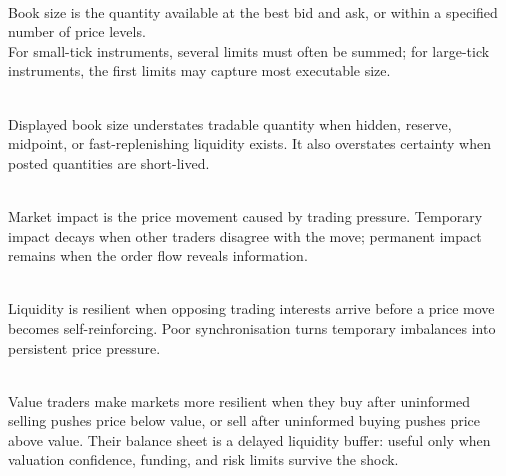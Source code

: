 \begin{definition} \\
Book size is the quantity available at the best bid and ask, or within a specified number of price levels.\\
For small-tick instruments, several limits must often be summed; for large-tick instruments, the first limits may capture most executable size.
\end{definition}

\begin{caveat} \\
Displayed book size understates tradable quantity when hidden, reserve, midpoint, or fast-replenishing liquidity exists. It also overstates certainty when posted quantities are short-lived.
\end{caveat}

\begin{mechanism} \\
Market impact is the price movement caused by trading pressure. Temporary impact decays when other traders disagree with the move; permanent impact remains when the order flow reveals information.
\end{mechanism}

\begin{principle} \\
Liquidity is resilient when opposing trading interests arrive before a price move becomes self-reinforcing. Poor synchronisation turns temporary imbalances into persistent price pressure.
\end{principle}

\begin{mechanism} \\
Value traders make markets more resilient when they buy after uninformed selling pushes price below value, or sell after uninformed buying pushes price above value. Their balance sheet is a delayed liquidity buffer: useful only when valuation confidence, funding, and risk limits survive the shock.
\end{mechanism}

